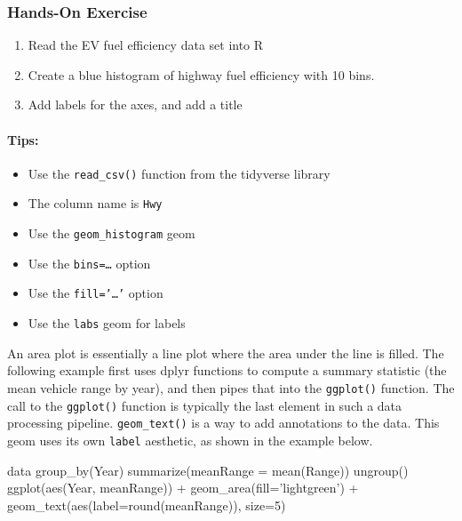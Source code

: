 \begin{tcolorbox}[colback=code]
\subsubsection*{Hands-On Exercise}
\begin{enumerate}
    \item Read the EV fuel efficiency data set into R
    \item Create a blue histogram of highway fuel efficiency with 10 bins.
    \item Add labels for the axes, and add a title
\end{enumerate}

\paragraph*{Tips:}
    \begin{itemize} 
		\item Use the \texttt{read\_csv()} function from the tidyverse library
       \item The column name is \texttt{Hwy}
       \item Use the \texttt{geom\_histogram} geom
       \item Use the \texttt{bins=\ldots} option
       \item Use the \texttt{fill='\ldots'} option
       \item Use the \texttt{labs} geom for labels
    \end{itemize}
\end{tcolorbox}

An area plot is essentially a line plot where the area under the line is filled. The following example first uses dplyr functions to compute a summary statistic (the mean vehicle range by year), and then pipes that into the \texttt{ggplot()} function. The call to the \texttt{ggplot()} function is typically the last element in such a data processing pipeline. \texttt{geom\_text()} is a way to add annotations to the data. This geom uses its own \texttt{label} aesthetic, as shown in the example below. 

\begin{Rcode}
data %
  group_by(Year) %
  summarize(meanRange = mean(Range)) %
  ungroup() %
  ggplot(aes(Year, meanRange)) + 
    geom_area(fill='lightgreen') +
    geom_text(aes(label=round(meanRange)), size=5)
\end{Rcode}

